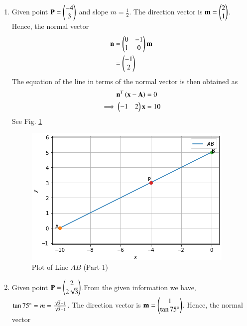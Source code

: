 \begin{enumerate}
    \item Given point $\mathbf{P} = \begin{pmatrix}-4\\3\end{pmatrix}$ and slope $m = \frac{1}{2}$.
    The direction vector is $\mathbf{m} = \begin{pmatrix}2\\1\end{pmatrix}$.  
    Hence, the normal vector
    \begin{align}
    \label{linform/2/14/eq:line_norm_dir}
    \mathbf{n} &= \begin{pmatrix}0&-1\\1&0\end{pmatrix}\mathbf{m} 
    \\
    &= \begin{pmatrix}-1\\2\end{pmatrix}
    \end{align}
    The equation of the line in terms of the normal vector is then obtained as
    \begin{align}
    \label{linform/2/14/eq:line_norm_vec}
    \mathbf{n}^T\left(\mathbf{x}-\mathbf{A}\right) &= 0
    \\
    \implies \begin{pmatrix}-1 & 2\end{pmatrix} \mathbf{x} &= 10
    \end{align}
    See Fig.     \ref{linform/2/14/Plot of Line $AB$ (Part-1)}
    \begin{figure}[ht]
    \centering
    \includegraphics[width=\columnwidth]{solutions/su2021/2/14/Line_Plot_Part1.PNG}
    \caption{Plot of Line $AB$ (Part-1)}
    \label{linform/2/14/Plot of Line $AB$ (Part-1)}
    \end{figure}
    \item Given point $\mathbf{P} = \begin{pmatrix}2\\2\sqrt{3}\end{pmatrix}$.From the given information we have, $\tan75\degree =m = \frac{\sqrt{3}+1}{\sqrt{3}-1}$.
    The direction vector is $\mathbf{m} = \begin{pmatrix}1\\\tan75\degree\end{pmatrix}$.  
    Hence, the normal vector

\end{enumerate}
